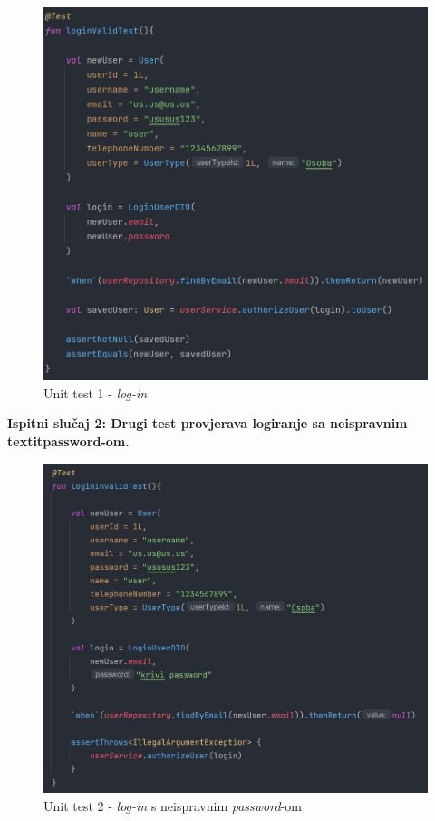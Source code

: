\begin{figure}[H]
			\includegraphics[scale=0.5]{slike/unit1.PNG} 
			\centering
			\caption{Unit test 1 - \textit{log-in}}
			\label{pawBoost}
		\end{figure}

\pagebreak
\textbf{Ispitni slučaj 2: Drugi test provjerava logiranje sa neispravnim textit{password}-om.}

\begin{figure}[H]
			\includegraphics[scale=0.5]{slike/unit2.PNG} 
			\centering
			\caption{Unit test 2 - \textit{log-in} s neispravnim \textit{password}-om}
			\label{pawBoost}
		\end{figure}

